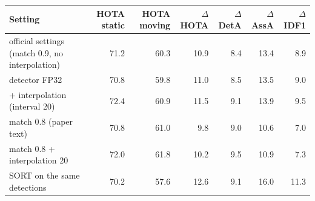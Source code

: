 \begin{tabular}{lrrrrrr}
\toprule
Setting & HOTA static & HOTA moving & $\Delta$HOTA & $\Delta$DetA & $\Delta$AssA & $\Delta$IDF1 \\
\midrule
official settings (match 0.9, no interpolation) & 71.2 & 60.3 & 10.9 & 8.4 & 13.4 & 8.9 \\
detector FP32 & 70.8 & 59.8 & 11.0 & 8.5 & 13.5 & 9.0 \\
+ interpolation (interval 20) & 72.4 & 60.9 & 11.5 & 9.1 & 13.9 & 9.5 \\
match 0.8 (paper text) & 70.8 & 61.0 & 9.8 & 9.0 & 10.6 & 7.0 \\
match 0.8 + interpolation 20 & 72.0 & 61.8 & 10.2 & 9.5 & 10.9 & 7.3 \\
SORT on the same detections & 70.2 & 57.6 & 12.6 & 9.1 & 16.0 & 11.3 \\
\bottomrule
\end{tabular}
